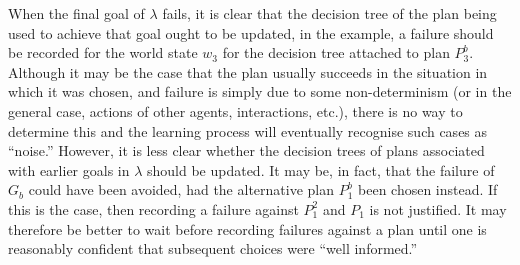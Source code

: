 When the final goal of $\lambda$ fails, it is clear that the decision
tree of the plan being used to achieve that goal ought to be updated, in
the example, a failure should be recorded for the world state $w_3$
for the decision tree attached to plan $P_3^b$.  Although it may be the case
that the plan usually succeeds in the situation in which it was
chosen, and failure is simply due to some non-determinism (or in the
general case, actions of other agents, interactions, etc.), there is
no way to determine this and the learning process will eventually
recognise such cases as ``noise.'' However, it is less clear whether
the decision trees of plans associated with earlier goals in $\lambda$
should be updated.  It may be, in fact, that the failure of $G_b$ could
have been avoided, had the alternative plan $P_1^b$ been chosen instead.
If this is the case, then recording a failure against $P_1^2$ and $P_1$ is not
justified.  It may therefore be better to wait before recording failures
against a plan until one is reasonably confident that subsequent choices were ``well informed.''

\newcommand{\procedurefont}[1]{\mathsf{#1}}
\newcommand{\StableGoal}{\procedurefont{StableGoal}}
\newcommand{\RecordTrace}{\procedurefont{RecordFailedTrace}}
\newcommand{\RecordWorldDT}{\procedurefont{RecordWorldDT}}



